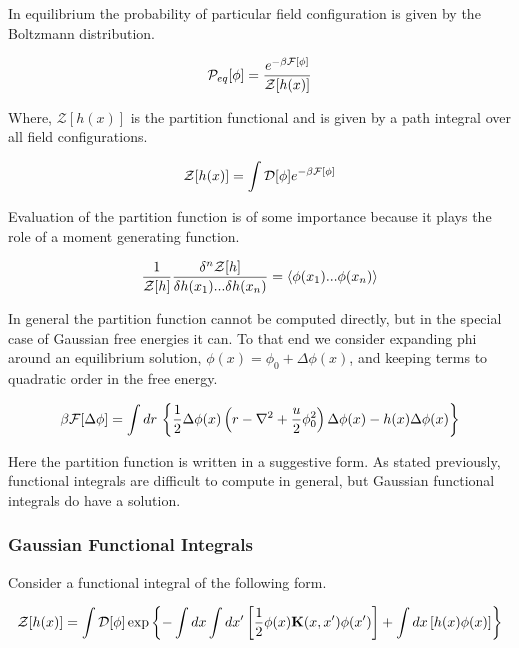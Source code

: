 In equilibrium the probability of particular field configuration is given by the Boltzmann distribution.

\begin{equation}
\mathcal{P}_{eq}[\phi] = \frac{e^{-\beta\mathcal{F}[\phi]}}{\mathcal{Z}[h(x)]}
\end{equation}

Where, $\mathcal{Z}[h(x)]$ is the partition functional and is given by a path integral over all field configurations.

\begin{equation}
\mathcal{Z}[h(x)] = \int \mathcal{D}[\phi] e^{-\beta\mathcal{F}[\phi]}
\end{equation}

Evaluation of the partition function is of some importance because it plays the role of a moment generating function.

\begin{equation}\label{gen}
\frac{1}{\mathcal{Z}[h]}\frac{\delta^n \mathcal{Z}[h]}{\delta h(x_1)...\delta h(x_n)} = \langle \phi(x_1)...\phi(x_n)\rangle
\end{equation}

In general the partition function cannot be computed directly, but in the special case of Gaussian free energies it can. To that end we consider expanding phi around an equilibrium solution, $\phi(x) = \phi_0 + \Delta\phi(x)$, and keeping terms to quadratic order in the free energy.

\begin{equation}
\beta\mathcal{F}[\Delta\phi] = \int dr \,\left\lbrace \frac{1}{2}\Delta\phi(x) \left(r - \nabla^2 + \frac{u}{2}\phi_0^2\right) \Delta\phi(x) - h(x)\Delta\phi(x) \right\rbrace
\end{equation}

Here the partition function is written in a suggestive form. As stated previously, functional integrals are difficult to compute in general, but Gaussian functional integrals do have a solution.

\subsubsection{Gaussian Functional Integrals}

Consider a functional integral of the following form.

\begin{equation}
\mathcal{Z}[h(x)] = \int \mathcal{D}[\phi] \exp\left\lbrace - \int dx \int dx^\prime \left[ \frac{1}{2}\phi(x) \mathbf{K}(x, x^\prime) \phi(x^\prime)\right] +  \int dx \left[h(x) \phi(x)\right]\right\rbrace
\end{equation}

